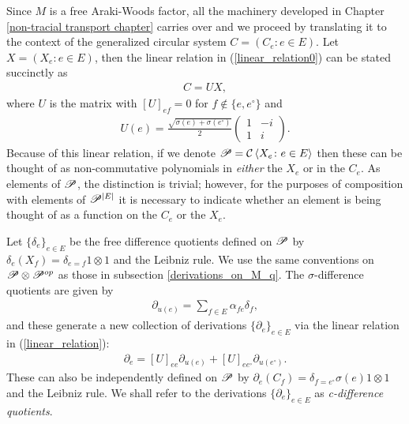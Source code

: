 Since $M$ is a free Araki-Woods factor, all the machinery developed in Chapter \ref{non-tracial transport chapter} carries over and we proceed by translating it to the context of the generalized circular system $C=(C_e\colon e\in E)$. Let $X=(X_e\colon e\in E)$, then the linear relation in (\ref{linear_relation0}) can be stated succinctly as
\begin{align}\label{linear_relation}
C=UX,
\end{align}
where $U$ is the matrix with $[U]_{ef}=0$ for $f\not\in \{e,e^\circ\}$ and
\begin{align*}
U(e)=\frac{\sqrt{\sigma(e)+\sigma(e^\circ)}}{2} \left(\begin{array}{cc} 1 & -i\\ 1 & i\end{array}\right).
\end{align*}
Because of this linear relation, if we denote $\P=\C\<X_e\colon e\in E\>$ then these can be thought of as non-commutative polynomials in \emph{either} the $X_e$ or in the $C_e$. As elements of $\P$, the distinction is trivial; however, for the purposes of composition with elements of $\P^{|E|}$ it is necessary to indicate whether an element is being thought of as a function on the $C_e$ or the $X_e$.\par

Let $\{\delta_e\}_{e\in E}$ be the free difference quotients defined on $\P$ by $\delta_e(X_f)=\delta_{e=f}1\otimes 1$ and the Leibniz rule. We use the same conventions on $\P\otimes \P^{op}$ as those in subsection \ref{derivations_on_M_q}. The $\sigma$-difference quotients are given by
	\begin{align*}
		\partial_{u(e)}=\sum_{f\in E}\alpha_{fe}\delta_{f},
	\end{align*}
and these generate a new collection of derivations $\{\partial_e\}_{e\in E}$ via the linear relation in (\ref{linear_relation}):
	\begin{align*}
		\partial_e=[U]_{ee}\partial_{u(e)} + [U]_{e e^\circ}\partial_{u(e^\circ)}.
	\end{align*}
These can also be independently defined on $\P$ by $\partial_e(C_f)=\delta_{f=e^\circ}\sigma(e) 1\otimes 1$ and the Leibniz rule. We shall refer to the derivations $\{\partial_e\}_{e\in E}$ as \emph{c-difference quotients}.\par

